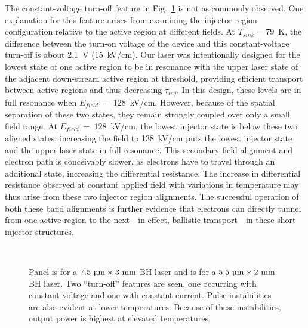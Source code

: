 The constant-voltage turn-off feature in Fig.~\ref{2well:laser_LIV} is not as commonly observed.  One explanation for this feature arises from examining the injector region configuration relative to the active region at different fields.  At $T_{sink}=79$~K, the difference between the turn-on voltage of the device and this constant-voltage turn-off is about 2.1~V (15~kV/cm).  Our laser was intentionally designed for the lowest state of one active region to be in resonance with the upper laser state of the adjacent down-stream active region at threshold, providing efficient transport between active regions and thus decreasing $\tau_\textit{inj}$.  In this design, these levels are in full resonance when $E_\textit{field}$~=~128~kV/cm.  However, because of the spatial separation of these two states, they remain strongly coupled over only a small field range.  At $E_\textit{field}$~=~128~kV/cm, the lowest injector state is below these two aligned states; increasing the field to 138~kV/cm puts the lowest injector state and the upper laser state in full resonance.  This secondary field alignment and electron path is conceivably slower, as electrons have to travel through an additional state, increasing the differential resistance.  The increase in differential resistance observed at constant applied field with variations in temperature may thus arise from these two injector region alignments.  The successful operation of both these band alignments is further evidence that electrons can directly tunnel from one active region to the next---in effect, ballistic transport---in these short injector structures.

\begin{figure}[tp]%
\centering%
%
\\%
%
\caption[Pulsed LIV data for the two injector well structure (I)]{ Panel  is for a $7.5~\tn{\um}\times3~\tn{mm}$ BH laser and  is for a $5.5~\tn{\um}\times2~\tn{mm}$ BH laser.  Two ``turn-off'' features are seen, one occurring with constant voltage and one with constant current.  Pulse instabilities are also evident at lower temperatures.  Because of these instabilities, output power is highest at elevated temperatures.}
\label{2well:laser_LIV}
\end{figure}

